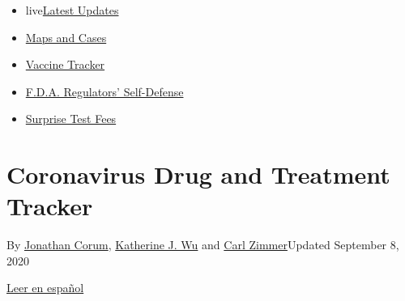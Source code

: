 \begin{itemize}
\tightlist
\item
  live\href{https://www.nytimes3xbfgragh.onion/2020/09/12/world/covid-19-coronavirus.html?name=styln-coronavirus-national\&region=TOP_BANNER\&block=storyline_menu_recirc\&action=click\&pgtype=Interactive\&impression_id=3f5e15a1-f52f-11ea-9322-a3eb5bc47b4b\&variant=undefined}{Latest
  Updates}
\item
  \href{https://www.nytimes3xbfgragh.onion/interactive/2020/us/coronavirus-us-cases.html?name=styln-coronavirus-national\&region=TOP_BANNER\&block=storyline_menu_recirc\&action=click\&pgtype=Interactive\&impression_id=3f5e15a2-f52f-11ea-9322-a3eb5bc47b4b\&variant=undefined}{Maps
  and Cases}
\item
  \href{https://www.nytimes3xbfgragh.onion/interactive/2020/science/coronavirus-vaccine-tracker.html?name=styln-coronavirus-national\&region=TOP_BANNER\&block=storyline_menu_recirc\&action=click\&pgtype=Interactive\&impression_id=3f5e15a3-f52f-11ea-9322-a3eb5bc47b4b\&variant=undefined}{Vaccine
  Tracker}
\item
  \href{https://www.nytimes3xbfgragh.onion/2020/09/10/us/politics/fda-coronavirus-vaccine.html?name=styln-coronavirus-national\&region=TOP_BANNER\&block=storyline_menu_recirc\&action=click\&pgtype=Interactive\&impression_id=3f5e15a4-f52f-11ea-9322-a3eb5bc47b4b\&variant=undefined}{F.D.A.
  Regulators' Self-Defense}
\item
  \href{https://www.nytimes3xbfgragh.onion/2020/09/09/upshot/coronavirus-surprise-test-fees.html?name=styln-coronavirus-national\&region=TOP_BANNER\&block=storyline_menu_recirc\&action=click\&pgtype=Interactive\&impression_id=3f5e15a5-f52f-11ea-9322-a3eb5bc47b4b\&variant=undefined}{Surprise
  Test Fees}
\end{itemize}

\hypertarget{coronavirus-drug-and-treatment-tracker}{%
\section{Coronavirus Drug and Treatment
Tracker}\label{coronavirus-drug-and-treatment-tracker}}

By \href{https://www.nytimes3xbfgragh.onion/by/jonathan-corum}{Jonathan
Corum},
\href{https://www.nytimes3xbfgragh.onion/by/katherine-j--wu}{Katherine
J. Wu} and \href{https://www.nytimes3xbfgragh.onion/by/carl-zimmer}{Carl
Zimmer}Updated September 8, 2020

\href{https://www.nytimes3xbfgragh.onion/es/interactive/2020/science/coronavirus-tratamientos-curas.html}{Leer
en español}

